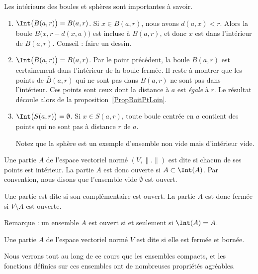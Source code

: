 \begin{example}			\label{ExempleIntBoules}
	Les intérieurs des boules et sphères sont importantes à savoir.
	\begin{enumerate}
		\item
		      \( \Int\big( B(a,r) \big)=B(a,r)\). Si \( x\in B(a,r)\), nous avons \( d(a,x)<r\). Alors la boule \( B\big(x,r-d(x,a)\big)\) est incluse à \( B(a,r)\), et donc \( x\) est dans l'intérieur de \( B(a,r)\). Conseil : faire un dessin.
		\item
		      \( \Int\big( \bar B(a,r) \big)=B(a,r)\). Par le point précédent, la boule \( B(a,r)\) est certainement dans l'intérieur de la boule fermée. Il reste à montrer que les points de \( \bar B(a,r)\) qui ne sont pas dans \( B(a,r)\) ne sont pas dans l'intérieur. Ces points sont ceux dont la distance à \( a\) est \emph{égale} à \( r\). Le résultat découle alors de la proposition~\ref{PropBoitPtLoin}.

		\item
		      \( \Int\big( S(a,r) \big)=\emptyset\). Si \( x\in S(a,r)\), toute boule centrée en \( a\) contient des points qui ne sont pas à distance \( r\) de \( a\).

		      Notez que la sphère est un exemple d'ensemble non vide mais d'intérieur vide.
	\end{enumerate}
\end{example}


\begin{definition}
	Une partie \( A\) de l'espace vectoriel normé \( (V,\| . \|)\) est dite  si chacun de ses points est intérieur. La partie \( A\) est donc ouverte si \( A\subset\Int(A)\). Par convention, nous disons que l'ensemble vide \( \emptyset\) est ouvert.

	Une partie est dite  si son complémentaire est ouvert. La partie \( A\) est donc fermée si \( V\setminus A\) est ouverte.
\end{definition}

Remarque : un ensemble \( A\) est ouvert si et seulement si \( \Int(A)=A\).

\begin{definition}
	Une partie \( A\) de l'espace vectoriel normé \( V\) est dite  si elle est fermée et bornée.
\end{definition}

Nous verrons tout au long de ce cours que les ensembles compacts, et les fonctions définies sur ces ensembles ont de nombreuses propriétés agréables.

